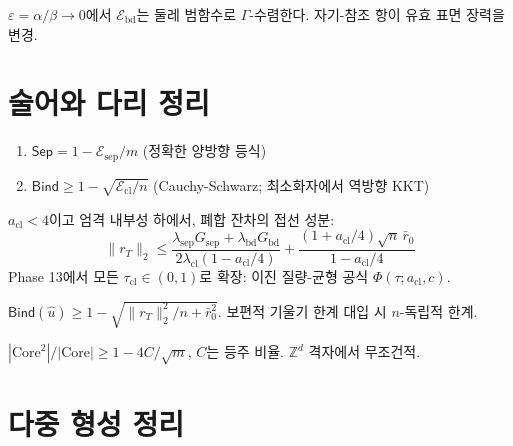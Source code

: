 \begin{theorem}
\label{thm:T11}
$\varepsilon = \alpha/\beta \to 0$에서 $\mathcal{E}_{\mathrm{bd}}$는 둘레 범함수로 $\Gamma$-수렴한다. 자기-참조 항이 유효 표면 장력을 변경.
\end{theorem}


\section{술어와 다리 정리}
\label{sec:predicate-bridge-theorems}

\begin{theorem}
\label{thm:PEB}
\begin{enumerate}
    \item $\mathsf{Sep} = 1 - \mathcal{E}_{\mathrm{sep}}/m$ \quad (정확한 양방향 등식)
    \item $\mathsf{Bind} \geq 1 - \sqrt{\mathcal{E}_{\mathrm{cl}}/n}$ \quad (Cauchy-Schwarz; 최소화자에서 역방향 KKT)
\end{enumerate}
\end{theorem}

\begin{theorem}
\label{thm:T-Bind-Proj}
$a_{\mathrm{cl}} < 4$이고 엄격 내부성 하에서, 폐합 잔차의 접선 성분:
\[
\|r_T\|_2 \leq \frac{\lambda_{\mathrm{sep}} G_{\mathrm{sep}} + \lambda_{\mathrm{bd}} G_{\mathrm{bd}}}{2\lambda_{\mathrm{cl}}(1 - a_{\mathrm{cl}}/4)} + \frac{(1 + a_{\mathrm{cl}}/4)\sqrt{n}\,\bar{r}_0}{1 - a_{\mathrm{cl}}/4}
\]
Phase 13에서 모든 $\tau_{\mathrm{cl}} \in (0,1)$로 확장: 이진 질량-균형 공식 $\Phi(\tau; a_{\mathrm{cl}}, c)$.
\end{theorem}

\begin{theorem}
\label{thm:T-Bind-Full}
$\mathsf{Bind}(\hat{u}) \geq 1 - \sqrt{\|r_T\|_2^2/n + \bar{r}_0^2}$. 보편적 기울기 한계 대입 시 $n$-독립적 한계.
\end{theorem}

\begin{theorem}
\label{thm:DCD2b}
$|\mathrm{Core}^2|/|\mathrm{Core}| \geq 1 - 4C/\sqrt{m}$, $C$는 등주 비율. $\mathbb{Z}^d$ 격자에서 무조건적.
\end{theorem}


\section{다중 형성 정리}
\label{sec:multi-formation-theorems}

